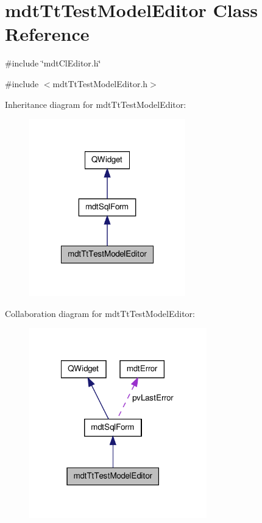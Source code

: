 \hypertarget{classmdt_tt_test_model_editor}{\section{mdt\-Tt\-Test\-Model\-Editor Class Reference}
\label{classmdt_tt_test_model_editor}
}


\#include \char`\"{}mdt\-Cl\-Editor.\-h\char`\"{}  




{\ttfamily \#include $<$mdt\-Tt\-Test\-Model\-Editor.\-h$>$}



Inheritance diagram for mdt\-Tt\-Test\-Model\-Editor\-:\nopagebreak
\begin{figure}[H]
\begin{center}
\leavevmode
\includegraphics[width=192pt]{classmdt_tt_test_model_editor__inherit__graph}
\end{center}
\end{figure}


Collaboration diagram for mdt\-Tt\-Test\-Model\-Editor\-:\nopagebreak
\begin{figure}[H]
\begin{center}
\leavevmode
\includegraphics[width=218pt]{classmdt_tt_test_model_editor__coll__graph}
\end{center}
\end{figure}
